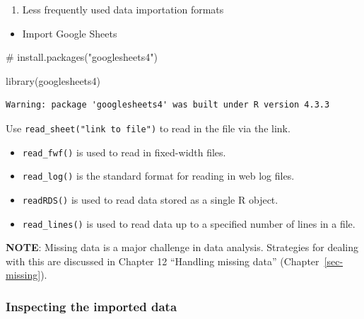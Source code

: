 \documentclass[
  letterpaper,
  DIV=11,
  numbers=noendperiod]{scrreprt}
\newenvironment{Shaded}{\begin{snugshade}}{\end{snugshade}}
\newcommand{\CommentTok}[1]{\textcolor[rgb]{0.37,0.37,0.37}{#1}}
\newcommand{\FunctionTok}[1]{\textcolor[rgb]{0.28,0.35,0.67}{#1}}
\newcommand{\NormalTok}[1]{\textcolor[rgb]{0.00,0.23,0.31}{#1}}
\providecommand{\tightlist}{%
  \setlength{\itemsep}{0pt}\setlength{\parskip}{0pt}}\usepackage{longtable,booktabs,array}
\begin{document}
\begin{enumerate}
\def\labelenumi{\arabic{enumi}.}
\setcounter{enumi}{1}
\tightlist
\item
  Less frequently used data importation formats
\end{enumerate}

\begin{itemize}
\tightlist
\item
  Import Google Sheets
\end{itemize}

\begin{Shaded}
\begin{Highlighting}[]
\CommentTok{\# install.packages("googlesheets4")}
\end{Highlighting}
\end{Shaded}

\begin{Shaded}
\begin{Highlighting}[]
\FunctionTok{library}\NormalTok{(googlesheets4)}
\end{Highlighting}
\end{Shaded}

\begin{verbatim}
Warning: package 'googlesheets4' was built under R version 4.3.3
\end{verbatim}

Use \texttt{read\_sheet("link\ to\ file")} to read in the file via the
link.

\begin{itemize}
\item
  \texttt{read\_fwf()} is used to read in fixed-width files.
\item
  \texttt{read\_log()} is the standard format for reading in web log
  files.
\item
  \texttt{readRDS()} is used to read data stored as a single R object.
\item
  \texttt{read\_lines()} is used to read data up to a specified number
  of lines in a file.
\end{itemize}

\textbf{NOTE}: Missing data is a major challenge in data analysis.
Strategies for dealing with this are discussed in Chapter 12 ``Handling
missing data'' (Chapter~\ref{sec-missing}).

\subsubsection{Inspecting the imported
data}\label{inspecting-the-imported-data}
\end{document}
